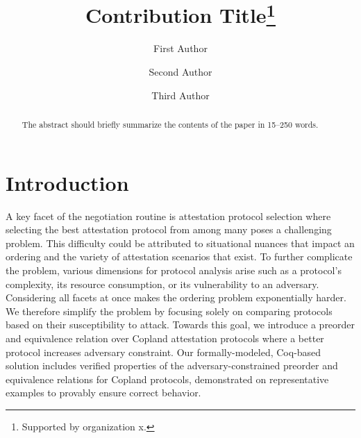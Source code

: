 \documentclass[runningheads]{llncs}
\theoremstyle{definition}
\begin{document}
%
\title{Contribution Title\thanks{Supported by organization x.}}
%
%
\author{First Author \and
Second Author \and
Third Author}
%
%
%
\maketitle              %
%
\begin{abstract}
The abstract should briefly summarize the contents of the paper in
15--250 words.

\end{abstract}
%
%
%
\section{Introduction}
A key facet of the negotiation routine is attestation protocol selection where selecting the best attestation protocol from among many poses a challenging problem. This difficulty could be attributed to situational nuances that impact an ordering and the variety of attestation scenarios that exist. To further complicate the problem, various dimensions for protocol analysis arise such as a protocol's complexity, its resource consumption, or its vulnerability to an adversary. Considering all facets at once makes the ordering problem exponentially harder. We therefore simplify the problem by focusing solely on comparing protocols based on their susceptibility to attack. Towards this goal, we introduce a preorder and equivalence relation over Copland attestation protocols where a better protocol increases adversary constraint. Our formally-modeled, Coq-based solution includes verified properties of the adversary-constrained preorder and equivalence relations for Copland protocols, demonstrated on representative examples to provably ensure correct behavior.
\end{document}
